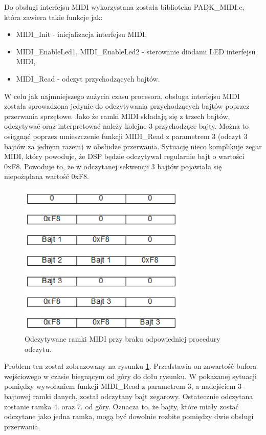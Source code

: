 Do obsługi interfejsu MIDI wykorzystana została biblioteka PADK\_MIDI.c, która zawiera takie funkcje jak:
\begin{itemize}
	\item MIDI\_Init - inicjalizacja interfejsu MIDI,
	\item MIDI\_EnableLed1, MIDI\_EnableLed2 - sterowanie diodami LED interfejsu MIDI,
	\item MIDI\_Read - odczyt przychodzących bajtów. 
\end{itemize}
W celu jak najmniejszego zużycia czasu procesora, obsługa interfejsu MIDI została sprowadzona jedynie do odczytywania przychodzących bajtów poprzez przerwania sprzętowe.
Jako że ramki MIDI składają się z trzech bajtów, odczytywać oraz interpretować należy kolejne 3 przychodzące bajty.
Można to osiągnąć poprzez umieszczenie funkcji MIDI\_Read z parametrem 3 (odczyt 3 bajtów za jednym razem) w obsłudze przerwania. Sytuację nieco komplikuje zegar MIDI, który powoduje, że DSP będzie odczytywał regularnie bajt o wartości 0xF8. Powoduje to, że w odczytanej sekwencji 3 bajtów pojawiała się niepożądana wartość 0xF8.
\begin{figure}[H]
	\centering
	\includegraphics[width=8cm]{./grafiki/real_nofifo}
	\captionsetup{justification=centering}
	\caption{Odczytywane ramki MIDI przy braku odpowiedniej procedury odczytu.}
	\label{rys:real_nofifo}
\end{figure} 
Problem ten został zobrazowany na rysunku \ref{rys:real_nofifo}. Przedstawia on zawartość bufora wejściowego w czasie biegnącym od góry do dołu rysunku. W pokazanej sytuacji pomiędzy wywołaniem funkcji MIDI\_Read z parametrem 3, a nadejściem 3-bajtowej ramki danych, został odczytany bajt zegarowy. Ostatecznie odczytana zostanie ramka 4. oraz 7. od góry.  Oznacza to, że bajty, które miały zostać odczytane jako jedna ramka, mogą być dowolnie rozbite pomiędzy dwie obsługi przerwania. 
